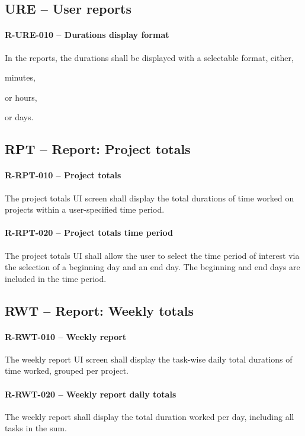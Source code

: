 \subsection{URE -- User reports}
\paragraph{R-URE-010 -- Durations display format}
In the reports, the durations shall be displayed with a selectable format,
either,
\begin{compactitem}
  \item minutes,
  \item or hours,
  \item or days.
\end{compactitem}

\subsection{RPT -- Report: Project totals}
\paragraph{R-RPT-010 -- Project totals}
The project totals \gls{UI} screen shall display the total durations of time
worked on projects within a user-specified time period.

\paragraph{R-RPT-020 -- Project totals time period}
The project totals \gls{UI} shall allow the user to select the time period
of interest via the selection of a beginning day and an end day. The
beginning and end days are included in the time period.

\subsection{RWT -- Report: Weekly totals}
\paragraph{R-RWT-010 -- Weekly report}
The weekly report \gls{UI} screen shall display the task-wise daily total
durations of time worked, grouped per project.

\paragraph{R-RWT-020 -- Weekly report daily totals}
The weekly report shall display the total duration worked per day, including
all tasks in the sum.

